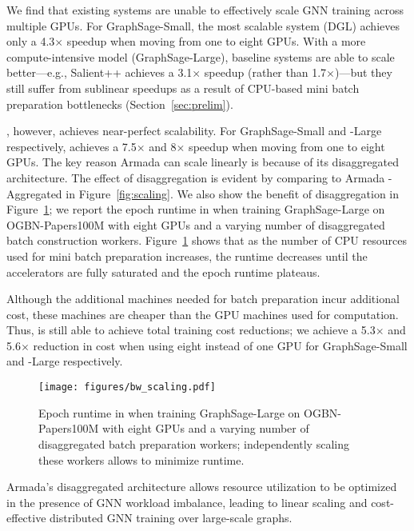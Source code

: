 We find that existing systems are unable to effectively scale GNN training across multiple GPUs. For GraphSage-Small, the most scalable system (DGL) achieves only a 4.3$\times$ speedup when moving from one to eight GPUs. With a more compute-intensive model (GraphSage-Large), baseline systems are able to scale better---e.g., Salient++ achieves a 3.1$\times$ speedup (rather than 1.7$\times$)---but they still suffer from sublinear speedups as a result of CPU-based mini batch preparation bottlenecks (Section~\ref{sec:prelim}).


\systemname, however, achieves near-perfect scalability. For GraphSage-Small and -Large respectively, \systemname achieves a 7.5$\times$ and 8$\times$ speedup when moving from one to eight GPUs. The key reason Armada can scale linearly is because of its disaggregated architecture. The effect of disaggregation is evident by comparing \systemname to Armada - Aggregated in Figure~\ref{fig:scaling}. We also show the benefit of disaggregation in Figure~\ref{fig:armada_bw_scaling}; we report the epoch runtime in \systemname when training GraphSage-Large on OGBN-Papers100M with eight GPUs and a varying number of disaggregated batch construction workers. Figure~\ref{fig:armada_bw_scaling} shows that as the number of CPU resources used for mini batch preparation increases, the runtime decreases until the accelerators are fully saturated and the epoch runtime plateaus.

Although the additional machines needed for batch preparation incur additional cost, these machines are cheaper than the GPU machines used for computation. Thus, \systemname is still able to achieve total training cost reductions; we achieve a 5.3$\times$ and 5.6$\times$ reduction in cost when using eight instead of one GPU for GraphSage-Small and -Large respectively. 

\begin{figure}[t]
  \centering
  \texttt{[image: figures/bw\_scaling.pdf]}
  \vspace{-0.05in}
  \caption{Epoch runtime in \systemname when training GraphSage-Large on OGBN-Papers100M with eight GPUs and a varying number of disaggregated batch preparation workers; independently scaling these workers allows \systemname to minimize runtime.}
  \label{fig:armada_bw_scaling}
  \vspace{-0.2in}
\end{figure}



Armada's disaggregated architecture allows resource utilization to be optimized in the presence of GNN workload imbalance, leading to linear scaling and cost-effective distributed GNN training over large-scale graphs.